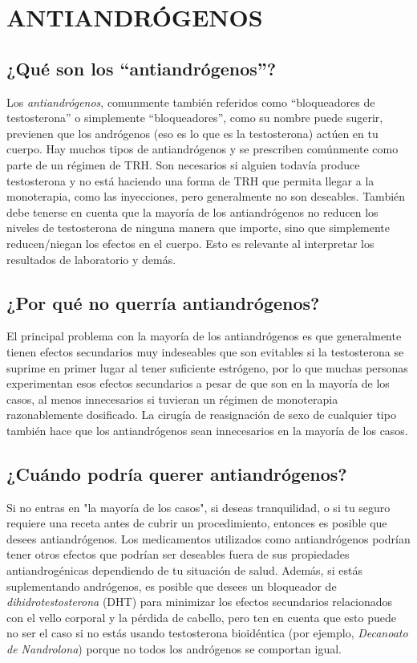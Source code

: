 \documentclass{article}
\begin{document}
\section{ANTIANDRÓGENOS}\label{AA}

\subsection{¿Qué son los “antiandrógenos”?}

Los \textit{antiandrógenos}, comunmente también referidos como “bloqueadores de testosterona” o simplemente “bloqueadores”, como su nombre puede sugerir, previenen que los andrógenos (eso es lo que es la testosterona) actúen en tu cuerpo. Hay muchos tipos de antiandrógenos y se prescriben comúnmente como parte de un régimen de TRH. Son necesarios si alguien todavía produce testosterona y no está haciendo una forma de TRH que permita llegar a la monoterapia, como las inyecciones, pero generalmente no son deseables. También debe tenerse en cuenta que la mayoría de los antiandrógenos no reducen los niveles de testosterona de ninguna manera que importe, sino que simplemente reducen/niegan los efectos en el cuerpo. Esto es relevante al interpretar los resultados de laboratorio y demás.

\subsection{¿Por qué no querría antiandrógenos?}

El principal problema con la mayoría de los antiandrógenos es que generalmente tienen efectos secundarios muy indeseables que son evitables si la testosterona se suprime en primer lugar al tener suficiente estrógeno, por lo que muchas personas experimentan esos efectos secundarios a pesar de que son \textemdash{}en la mayoría de los casos, al menos\textemdash{} innecesarios si tuvieran un régimen de monoterapia razonablemente dosificado. La cirugía de reasignación de sexo de cualquier tipo también hace que los antiandrógenos sean innecesarios en la mayoría de los casos.

\subsection{¿Cuándo podría querer antiandrógenos?}

Si no entras en "la mayoría de los casos", si deseas tranquilidad, o si tu seguro requiere una receta antes de cubrir un procedimiento, entonces es posible que desees antiandrógenos. Los medicamentos utilizados como antiandrógenos podrían tener otros efectos que podrían ser deseables fuera de sus propiedades antiandrogénicas dependiendo de tu situación de salud. Además, si estás suplementando andrógenos, es posible que desees un bloqueador de \textit{dihidrotestosterona} (DHT) para minimizar los efectos secundarios relacionados con el vello corporal y la pérdida de cabello, pero ten en cuenta que esto puede no ser el caso si no estás usando testosterona bioidéntica (por ejemplo, \textit{Decanoato de Nandrolona}) porque no todos los andrógenos se comportan igual.
\end{document}
